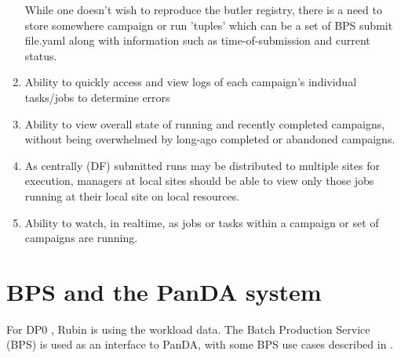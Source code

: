 \documentclass[DM,authoryear,toc]{lsstdoc}
\begin{document}
\begin{enumerate}
	While one doesn't wish to reproduce the butler registry, there
	is a need to store somewhere campaign or run 'tuples' which
	can be a set of BPS submit file.yaml along with information
	such as time-of-submission and current status.

	\item Ability to quickly access and view logs of each 
	campaign's individual tasks/jobs to determine errors

	\item Ability to view overall state of running and recently
	completed campaigns, without being overwhelmed by long-ago completed
	or abandoned campaigns.

	\item As centrally (DF) submitted runs may be distributed to 
	multiple sites for execution, managers at local sites should 
	be able to view only those jobs running at their local site on local 
	resources.

	\item Ability to watch, in realtime, as jobs or tasks within
	a campaign or set of campaigns are running.  

	\end {enumerate}

\section{BPS and the PanDA system}

For DP0 \cite{RTN-013}, Rubin is using 
the \cite{PanDA} workload data.  The Batch Production 
Service (BPS) \cite{LDM-636} is used as an interface to PanDA, with
some BPS use cases described in \cite{LDM-633}.  
\end{document}
